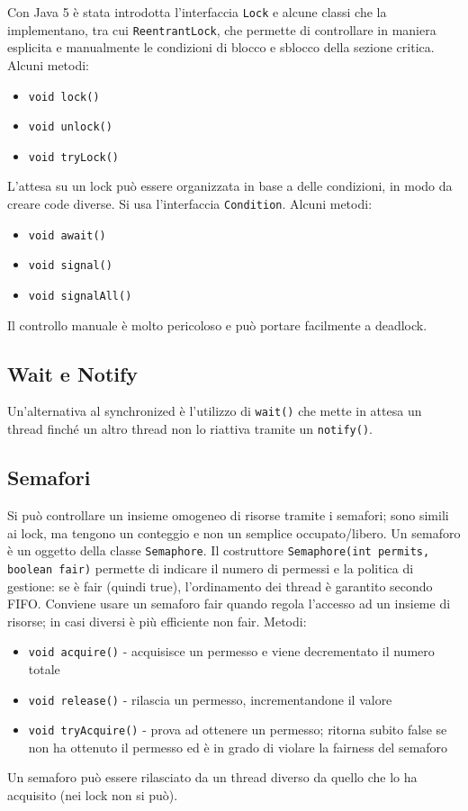 Con Java 5 è stata introdotta l'interfaccia \texttt{Lock} e alcune classi che la implementano, tra cui \texttt{ReentrantLock}, che permette di controllare in maniera esplicita e manualmente le condizioni di blocco e sblocco della sezione critica. Alcuni metodi: 
\begin{itemize}
\item \texttt{void lock()}
\item \texttt{void unlock()}
\item \texttt{void tryLock()} 
\end{itemize}
L'attesa su un lock può essere organizzata in base a delle condizioni, in modo da creare code diverse. Si usa l'interfaccia \texttt{Condition}. Alcuni metodi: 
\begin{itemize}
\item \texttt{void await()}
\item \texttt{void signal()}
\item \texttt{void signalAll()} 
\end{itemize}
Il controllo manuale è molto pericoloso e può portare facilmente a deadlock.
\subsection{Wait e Notify}
Un'alternativa al synchronized è l'utilizzo di \texttt{wait()} che mette in attesa un thread finché un altro thread non lo riattiva tramite un \texttt{notify()}. 

\subsection{Semafori}
Si può controllare un insieme omogeneo di risorse tramite i semafori; sono simili ai lock, ma tengono un conteggio e non un semplice occupato/libero. Un semaforo è un oggetto della classe \texttt{Semaphore}. Il costruttore \texttt{Semaphore(int permits, boolean fair)} permette di indicare il numero di permessi e la politica di gestione: se è fair (quindi true), l'ordinamento dei thread è garantito secondo FIFO. Conviene usare un semaforo fair quando regola l'accesso ad un insieme di risorse; in casi diversi è più efficiente non fair. Metodi:
\begin{itemize}
\item \texttt{void acquire()} - acquisisce un permesso e viene decrementato il numero totale
\item \texttt{void release()} - rilascia un permesso, incrementandone il valore
\item \texttt{void tryAcquire()} - prova ad ottenere un permesso; ritorna subito false se non ha ottenuto il permesso ed è in grado di violare la fairness del semaforo
\end{itemize}
Un semaforo può essere rilasciato da un thread diverso da quello che lo ha acquisito (nei lock non si può).
